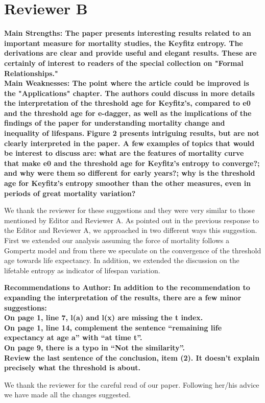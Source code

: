 \documentclass[a4paper,twoside, openright, 12pt, leqno]{article}
\begin{document}
\section*{Reviewer B}
\textbf{Main Strengths:
The paper presents interesting results related to an important measure for mortality studies, the Keyfitz entropy. The derivations are clear and provide useful and elegant results. These are certainly of interest to readers of the special collection on "Formal Relationships."}\\

\textbf{Main Weaknesses:
The point where the article could be improved is the "Applications" chapter. The authors could discuss in more details the interpretation of the threshold age for Keyfitz's, compared to e0 and the threshold age for e-dagger, as well as the implications of the findings of the paper for understanding mortality change and inequality of lifespans.} \textbf{Figure 2 presents intriguing results, but are not clearly interpreted in the paper. A few examples of topics that would be interest to discuss are: what are the features of mortality curve that make e0 and the threshold age for Keyfitz's entropy to converge?; and why were them so different for early years?; why is the threshold age for Keyfitz's entropy smoother than the other measures, even in periods of great mortality variation?}
\linebreak

We thank the reviewer for these suggestions and they were very similar to those mentioned by Editor and Reviewer A. As pointed out in the previous response to the Editor and Reviewer A, we approached in two different ways this suggestion. First we extended our analysis assuming the force of mortality follows a Gompertz model and from there we speculate on the convergence of the threshold age towards life expectancy. In addition, we extended the discussion on the lifetable entropy as indicator of lifespan variation.
\linebreak

\textbf{
Recommendations to Author:
In addition to the recommendation to expanding the interpretation of the results, there are a few minor suggestions:\\
On page 1, line 7, l(a) and l(x) are missing the t index.\\
On page 1, line 14, complement the sentence “remaining life expectancy at age a” with “at time t”.\\
On page 9, there is a typo in “Not the similarity”. \\
Review the last sentence of the conclusion, item (2). It doesn’t explain precisely what the threshold is about.}
\linebreak

We thank the reviewer for the careful read of our paper. Following her/his advice we have made all the changes suggested.



\end{document}
